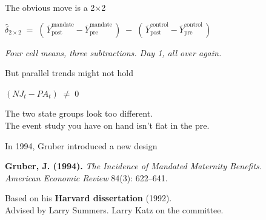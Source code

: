 \documentclass[aspectratio=169,11pt]{beamer}
\begin{document}
\begin{frame}{The obvious move is a 2$\times$2}
\vspace{2.4em}
\begin{center}
$\widehat{\delta}_{2\times 2} \;=\; (\,\overline{Y}^{\text{mandate}}_{\text{post}} - \overline{Y}^{\text{mandate}}_{\text{pre}}\,) \;-\; (\,\overline{Y}^{\text{control}}_{\text{post}} - \overline{Y}^{\text{control}}_{\text{pre}}\,)$
\end{center}
\vspace{2em}
\begin{center}
\small\color{warmgray}\itshape
Four cell means, three subtractions. \;Day 1, all over again.
\end{center}
\end{frame}

\begin{frame}{But parallel trends might not hold}
\vspace{1.4em}
\begin{center}
\Large
$(NJ_t - PA_t) \;\neq\; 0$
\end{center}
\vspace{1.2em}
\begin{center}
The two state groups look too different. \\[0.4em]
The event study you have on hand isn't flat in the pre.
\end{center}
\end{frame}

\begin{frame}[plain]
\end{frame}

\begin{frame}{In 1994, Gruber introduced a new design}
\vspace{0.8em}
\begin{center}
\textbf{Gruber, J. (1994).} \;\textit{The Incidence of Mandated Maternity Benefits.}\\[0.2em]
\textit{American Economic Review} 84(3): 622--641.
\end{center}
\vspace{1em}
\begin{center}
Based on his \textbf{Harvard dissertation} (1992). \\[0.3em]
Advised by Larry Summers. \;Larry Katz on the committee.
\end{center}
\end{frame}
\end{document}
